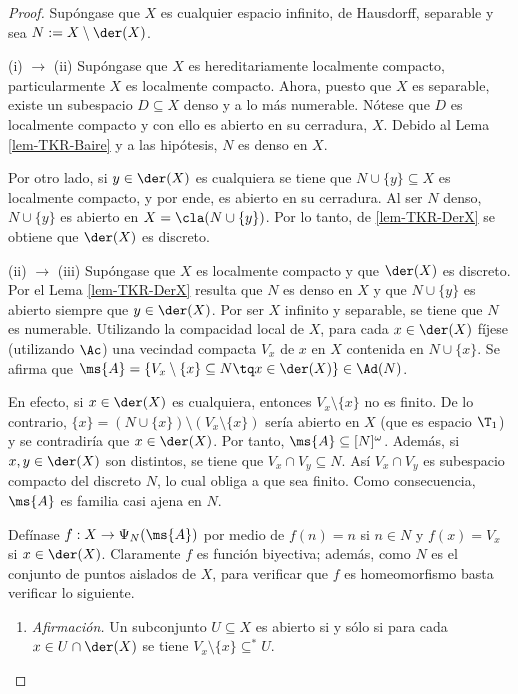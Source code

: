 	\begin{proof} 
		Supóngase que $X$ es cualquier espacio infinito, de Hausdorff, separable y sea $N:=X \setminus \der(X)$.
	
	(i) $\rightarrow$ (ii) Supóngase que $X$ es hereditariamente localmente compacto, particularmente $X$ es localmente compacto. Ahora, puesto que $X$ es separable, existe un subespacio $D \subseteq X$ denso y a lo más numerable. Nótese que $D$ es localmente compacto y con ello es abierto en su cerradura, $X$. Debido al Lema \ref{lem-TKR-Baire} y a las hipótesis, $N$ es denso en $X$.
	
	Por otro lado, si $y \in \der(X)$ es cualquiera se tiene que $N \cup \{y\} \subseteq X$ es localmente compacto, y por ende, es abierto en su cerradura. Al ser $N$ denso, $N \cup \{y\}$ es abierto en $X=\cla(N \cup \{y\})$. Por lo tanto, de \ref{lem-TKR-DerX} se obtiene que $\der(X)$ es discreto.
	
	(ii) $\rightarrow$ (iii) Supóngase que $X$ es localmente compacto y que $\der(X)$ es discreto. Por el Lema \ref{lem-TKR-DerX} resulta que $N$ es denso en $X$ y que $N \cup \{y\}$ es abierto siempre que $y \in \der(X)$. Por ser $X$ infinito y separable, se tiene que $N$ es numerable. Utilizando la compacidad local de $X$, para cada $x \in \der(X)$ fíjese (utilizando $\Ac$) una vecindad compacta $V_x$ de $x$ en $X$ contenida en $N \cup \{x\}$. Se afirma que $ \ms{A} = \{ V_x \setminus \{x\} \subseteq N \tq x \in \der(X) \} \in \Ad(N) $.
	
	En efecto, si $x \in \der(X)$ es cualquiera, entonces $V_x \setminus \{x\}$ no es finito. De lo contrario, $\{x\}= (N \cup \{x\}) \setminus (V_x \setminus \{x\})$ sería abierto en $X$ (que es espacio $\T_1$) y se contradiría que $x \in \der(X)$. Por tanto, $\ms{A} \subseteq [N]^\omega$. Además, si $x,y \in \der(X)$ son distintos, se tiene que $V_x \cap V_y \subseteq N$. Así $V_x \cap V_y$ es subespacio compacto del discreto $N$, lo cual obliga a que sea finito. Como consecuencia, $\ms{A}$ es familia casi ajena en $N$.
	
	Defínase $f:X \to \Psi_N(\ms{A})$ por medio de $f(n)=n$ si $n \in N$ y $f(x)=V_x$ si $x \in \der(X)$. Claramente $f$ es función biyectiva; además, como $N$ es el conjunto de puntos aislados de $X$, para verificar que $f$ es homeomorfismo basta verificar lo siguiente.	
	\begin{enumerate}[\hspace{1.5 cm}, listparindent=1.5em]
		\item \textit{Afirmación.} Un subconjunto $U \subseteq X$ es abierto si y sólo si para cada $x \in U \cap \der(X)$ se tiene $V_x \setminus \{x\} \subseteq^* U$.
		

\end{enumerate}
\end{proof}

